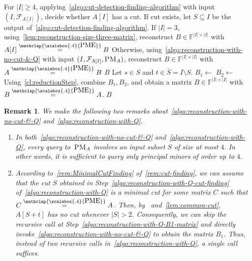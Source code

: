 \documentclass[11pt,letterpaper]{article}
\newcommand{\comp}[1]{\overline{#1}}
\newcommand{\F}{\mathbb{F}}
\newtheorem{remark}{Remark}[section]
\newcommand{\PME}{\stackrel{\mathclap{\scalebox{.4}{\mbox{PME}}}}{=}}
\newcommand{\PMoracle}[1]{\textsc{PM}_{#1}}
\newcommand{\submatrixfamily}[1]{\mathcal{F}_{#1}}
\begin{document}
{{{\begin{algorithm}[H]
\begin{algorithmic}[1]
\bigskip
{}
\State For $|I|\geq 4$, applying~\cref{algo:cut-detection-finding-algorithm} with input $(I, \submatrixfamily{A[I]})$, decide whether $A[I]$ has a cut. If cut exists, let $S\subseteq I$ be the output of~\cref{algo:cut-detection-finding-algorithm}.\label{algo:reconstruction-with-Q-cut-finding}
\State If $|I|=3$, using~\cref{lem:reconstruction-size-three-matrix}, reconstruct $B\in \F^{|I|\times |I|}$ with $A[I]\PME B$
\State Otherwise, using~\cref{algo:reconstruction-with-no-cut-&-Q} with input $(I, \submatrixfamily{A[I]}, \PMoracle{A})$, reconstruct $B\in\F^{|I|\times |I|}$ with $A\PME B$\label{algo:reconstruction-with-Q-no-cut-reconstr-step}
\State \Return $B$
\Else
\State Let $s\in S$ and $t\in \comp{S}=I\setminus S$.
\State $B_1\leftarrow$ \label{algo:reconstruction-with-Q-B1-matrix}
\State $B_2\leftarrow$\Call{Reconstruct}{$\comp S+t$}\label{algo:reconstruction-with-Q-B2-matrix}
\State Using~\cref{cl:reductionStep}, combine $B_1, B_2$, and obtain a matrix $B\in\F^{|I|\times |I|}$ with $B\PME A$.\label{algo:reconstruction-with-Q-combine-step}
\State \Return $B$
\EndIf
\EndFunction
\end{algorithmic}
\end{algorithm}
\begin{remark} We make the following two remarks about~\cref{algo:reconstruction-with-no-cut-&-Q} and~\cref{algo:reconstruction-with-Q}.
\begin{enumerate}
\item In both~\cref{algo:reconstruction-with-no-cut-&-Q} and~\cref{algo:reconstruction-with-Q}, every query to~$\PMoracle{A}$ involves an input subset $S$ of size at most $4$. In other words, it is sufficient to query only principal minors of  order up to $4$.

\item According to~\cref{rem:MinimalCutFinding} of~\cref{rem:cut-finding}, we can assume that the cut $S$ obtained in Step~\ref{algo:reconstruction-with-Q-cut-finding} of~\cref{algo:reconstruction-with-Q} is a minimal cut for some matrix $C$ such that $C\PME A$. Then, by~\cite[Lemma~3.3]{Chatterjee25} and~\cref{lem:common-cut}, $A[S+t]$ has no cut whenever $|S|>2$. Consequently, we can skip the recursive call at Step~\ref{algo:reconstruction-with-Q-B1-matrix} and directly invoke~\cref{algo:reconstruction-with-no-cut-&-Q} to obtain the matrix $B_1$. Thus, instead of two recursive calls in~\cref{algo:reconstruction-with-Q}, a single call suffices.
\end{enumerate}
\end{remark}

}}}
\end{document}
